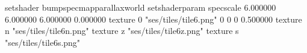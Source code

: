setshader bumpspecmapparallaxworld
setshaderparam specscale 6.000000 6.000000 6.000000 0.000000
texture 0 "ses/tiles/tile6.png" 0 0 0 0.500000
texture n "ses/tiles/tile6n.png"
texture z "ses/tiles/tile6z.png"
texture s "ses/tiles/tile6s.png"

